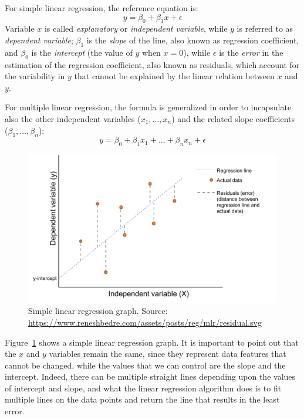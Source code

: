For simple linear regression, the reference equation is: \[y = \beta_0 + \beta_1x + \epsilon\]
Variable \(x\) is called \textit{explanatory} or \textit{independent variable}, while \(y\) is referred to as \textit{dependent variable}; \(\beta_1\) is the \textit{slope} of the line, also known as regression coefficient, and \(\beta_0\) is the \textit{intercept} (the value of \(y\) when \(x = 0\)), while \(\epsilon\) is the \textit{error} in the estimation of the regression coefficient, also known as residuals, which account for the variability in \(y\) that cannot be explained by the linear relation between \(x\) and \(y\).

For multiple linear regression, the formula is generalized in order to incapsulate also the other independent variables (\(x_1, \ldots, x_n\)) and the related slope coefficients (\(\beta_1, \ldots, \beta_n\)): \[y = \beta_0 + \beta_1x_1 + \ldots + \beta_nx_n + \epsilon\]

\begin{figure}[h!]
\includegraphics[scale=.7]{figures/simple_linear_regression.pdf}
\centering
\caption{Simple linear regression graph.\newline
Source: \upshape\protect\url{https://www.reneshbedre.com/assets/posts/reg/mlr/residual.svg}}
\label{fig:simple_linear_regression}
\end{figure}

Figure~\ref{fig:simple_linear_regression} shows a simple linear regression graph. It is important to point out that the \(x\) and \(y\) variables remain the same, since they represent data features that cannot be changed, while the values that we can control are the slope and the intercept. Indeed, there can be multiple straight lines depending upon the values of intercept and slope, and what the linear regression algorithm does is to fit multiple lines on the data points and return the line that results in the least error.

